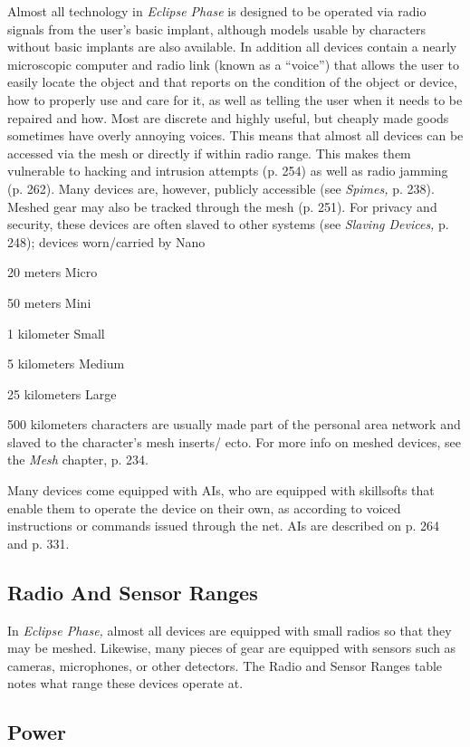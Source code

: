 Almost all technology in \textit{Eclipse Phase} is designed 
to be operated via radio signals from the user's basic 
implant, although models usable by characters without
basic implants are also available. In addition all
devices contain a nearly microscopic computer and 
radio link (known as a ``voice'') that allows the user to 
easily locate the object and that reports on the condition
of the object or device, how to properly use and
care for it, as well as telling the user when it needs 
to be repaired and how. Most are discrete and highly 
useful, but cheaply made goods sometimes have overly 
annoying voices.
This means that almost all devices can be accessed 
via the mesh or directly if within radio range. This 
makes them vulnerable to hacking and intrusion attempts
(p. 254) as well as radio jamming (p. 262).
Many devices are, however, publicly accessible (see 
\textit{Spimes,} p. 238). Meshed gear may also be tracked 
through the mesh (p. 251). For privacy and security, 
these devices are often slaved to other systems (see 
\textit{Slaving Devices,} p. 248); devices worn/carried by 
Nano

20 meters
Micro

50 meters
Mini

1 kilometer
Small

5 kilometers
Medium

25 kilometers
Large

500 kilometers
characters are usually made part of the personal area 
network and slaved to the character's mesh inserts/
ecto. For more info on meshed devices, see the \textit{Mesh}
chapter, p. 234.

Many devices come equipped with AIs, who are 
equipped with skillsofts that enable them to operate
the device on their own, as according to voiced
instructions or commands issued through the net. AIs 
are described on p. 264 and p. 331.

\subsection{Radio And Sensor Ranges}

In \textit{Eclipse Phase,} almost all devices are equipped with 
small radios so that they may be meshed. Likewise, 
many pieces of gear are equipped with sensors such as 
cameras, microphones, or other detectors. The Radio 
and Sensor Ranges table notes what range these devices
operate at.

\subsection{Power}

